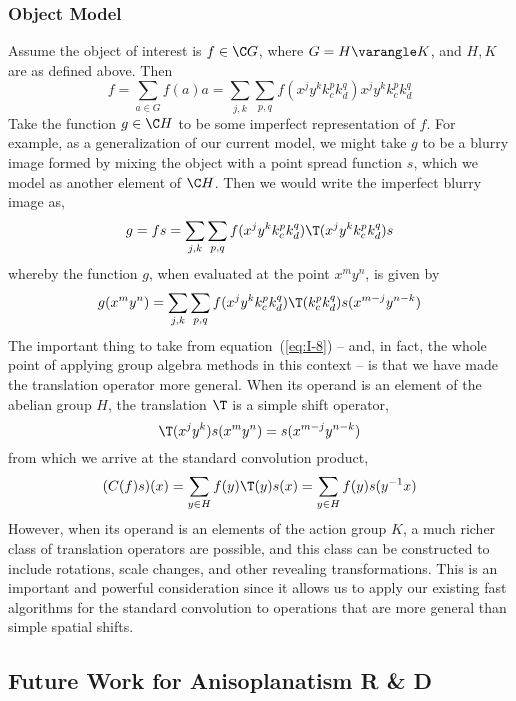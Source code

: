 \subsubsection{Object Model}
Assume the object of interest is $f\in \C G$, where $G =
H\varangle K$, and $H, K$ are as defined above.  Then
\[ 
f = \sum_{a\in G} f(a) a = \sum_{j,k}\sum_{p,q} f(x^jy^kk_c^pk_d^q) x^jy^kk_c^pk_d^q
\]
Take the function $g\in \C H$ to be some imperfect representation of $f$.
For example, as a generalization of our current model, we might take $g$ to be a
blurry image formed by mixing the object with a point spread function $s$, which
we model as another element of $\C H$.  Then we would write the imperfect blurry
image as,
\[
g = fs = \sum_{j,k}\sum_{p,q} f(x^jy^kk_c^pk_d^q) \T(x^jy^kk_c^pk_d^q)s
\]
whereby the function $g$, when evaluated at the point $x^my^n$, is given by
\begin{equation}\label{eq:I-8}
g(x^my^n) = \sum_{j,k}\sum_{p,q} f(x^jy^kk_c^pk_d^q)
\T(k_c^pk_d^q)s(x^{m-j}y^{n-k})
\end{equation}
The important thing to take from equation~(\ref{eq:I-8}) -- and, in fact, the whole
point of applying group algebra methods in this context -- is that we have made
the translation operator more general.  When its operand is an element of the
abelian group $H$, the translation $\T$ is a simple shift operator,
\[
\T(x^jy^k)s(x^{m}y^{n}) =s(x^{m-j}y^{n-k})
\]
from which we arrive at the standard convolution product,
\[
(C(f)s)(x) = \sum_{y\in H} f(y)\T(y)s(x) = \sum_{y\in H} f(y)s(y^{-1}x)
\]
However, when its operand is an elements of the action group $K$,
a much richer class of translation operators are possible, and this class can be
constructed to include rotations, scale changes, and other revealing
transformations.  This is an important and powerful consideration since it
allows us to apply our existing fast algorithms for the standard convolution to
operations that are more general than simple spatial shifts.  

\subsection{Future Work for Anisoplanatism R \& D}
